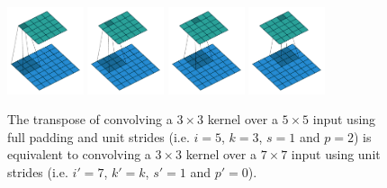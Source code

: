 \documentclass{article}
\begin{document}
\begin{figure}[t]
    \centering
    \includegraphics[width=0.2\textwidth]
        {pdf/full_padding_no_strides_transposed_00.pdf}
    \includegraphics[width=0.2\textwidth]
        {pdf/full_padding_no_strides_transposed_01.pdf}
    \includegraphics[width=0.2\textwidth]
        {pdf/full_padding_no_strides_transposed_02.pdf}
    \includegraphics[width=0.2\textwidth]
        {pdf/full_padding_no_strides_transposed_03.pdf}
    \caption{\label{fig:full_padding_no_strides_transposed} The transpose
        of convolving a $3 \times 3$ kernel over a $5 \times 5$ input using full
        padding and unit strides (i.e. $i = 5$, $k = 3$, $s = 1$ and $p = 2$) is
        equivalent to convolving a $3 \times 3$ kernel over a $7 \times 7$ input
        using unit strides (i.e. $i' = 7$, $k' = k$, $s' = 1$ and $p' = 0$).}
\end{figure}
\end{document}
